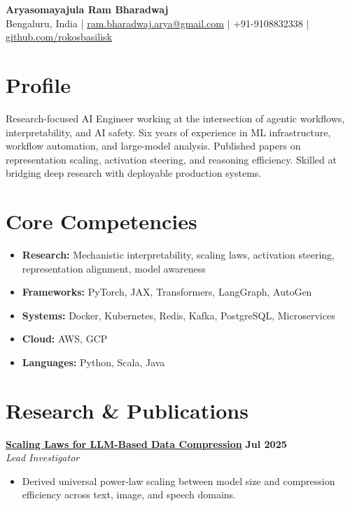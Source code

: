 \documentclass[11pt]{article}
\begin{document}
\begin{center}
\textbf{\Large Aryasomayajula Ram Bharadwaj} \\
\vspace{4pt}
Bengaluru, India | \href{mailto:ram.bharadwaj.arya@gmail.com}{ram.bharadwaj.arya@gmail.com} | +91-9108832338 | \href{https://github.com/rokosbasilisk}{github.com/rokosbasilisk}
\end{center}

\vspace{12pt}

\section{Profile}
Research-focused AI Engineer working at the intersection of agentic workflows, interpretability, and AI safety. Six years of experience in ML infrastructure, workflow automation, and large-model analysis. Published papers on representation scaling, activation steering, and reasoning efficiency. Skilled at bridging deep research with deployable production systems.

\section{Core Competencies}
\begin{itemize}[leftmargin=*,nosep]
\item \textbf{Research:} Mechanistic interpretability, scaling laws, activation steering, representation alignment, model awareness
\item \textbf{Frameworks:} PyTorch, JAX, Transformers, LangGraph, AutoGen
\item \textbf{Systems:} Docker, Kubernetes, Redis, Kafka, PostgreSQL, Microservices
\item \textbf{Cloud:} AWS, GCP
\item \textbf{Languages:} Python, Scala, Java
\end{itemize}

\section{Research \& Publications}
\textbf{\href{https://fullwrong.com/2025/07/23/scaling-compression/}{Scaling Laws for LLM-Based Data Compression}} \hfill \textbf{Jul 2025}\\
\textit{Lead Investigator}
\begin{itemize}[leftmargin=*,nosep]
\item Derived universal power-law scaling between model size and compression efficiency across text, image, and speech domains.
\end{itemize}
\end{document}
